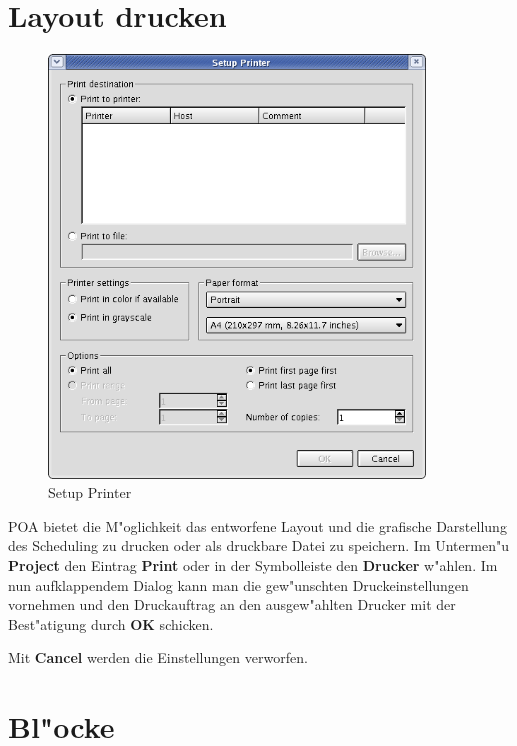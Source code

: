 \documentclass[a4paper,titlepage,12pt,ngerman]{scrbook}
\begin{document}
\section{Layout drucken}
\begin{figure}[htbp]

\begin{center}

\includegraphics[width=10cm]{Printer}

\caption{Setup Printer}\label{test}

\end{center}

\end{figure}
POA bietet die M"oglichkeit das entworfene Layout und die grafische Darstellung des Scheduling zu drucken oder als druckbare Datei zu speichern.
Im Untermen"u {\bf Project} den Eintrag {\bf Print} oder in der Symbolleiste den {\bf Drucker} w"ahlen. Im nun aufklappendem Dialog kann man die gew"unschten Druckeinstellungen vornehmen und den Druckauftrag an den ausgew"ahlten Drucker mit der Best"atigung durch {\bf OK} schicken.\par
Mit {\bf Cancel} werden die Einstellungen verworfen.\par






\section{Bl"ocke}
\end{document}
